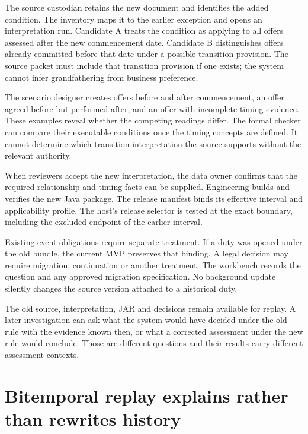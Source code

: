 The source custodian retains the new document and identifies the added condition.
The inventory maps it to the earlier exception and opens an interpretation run.
Candidate A treats the condition as applying to all offers assessed after the
new commencement date. Candidate B distinguishes offers already committed before
that date under a possible transition provision. The source packet must include
that transition provision if one exists; the system cannot infer grandfathering
from business preference.

The scenario designer creates offers before and after commencement, an offer
agreed before but performed after, and an offer with incomplete timing evidence.
These examples reveal whether the competing readings differ. The formal checker
can compare their executable conditions once the timing concepts are defined.
It cannot determine which transition interpretation the source supports without
the relevant authority.


When reviewers accept the new interpretation, the data owner confirms that the
required relationship and timing facts can be supplied. Engineering builds and
verifies the new Java package. The release manifest binds its effective interval
and applicability profile. The host's release selector is tested at the exact
boundary, including the excluded endpoint of the earlier interval.

Existing event obligations require separate treatment. If a duty was opened under
the old bundle, the current MVP preserves that binding. A legal decision may
require migration, continuation or another treatment. The workbench records the
question and any approved migration specification. No background update silently
changes the source version attached to a historical duty.

The old source, interpretation, JAR and decisions remain available for replay.
A later investigation can ask what the system would have decided under the old
rule with the evidence known then, or what a corrected assessment under the new
rule would conclude. Those are different questions and their results carry
different assessment contexts.

\section{Bitemporal replay explains rather than rewrites history}
\label{merge:M10:06}


